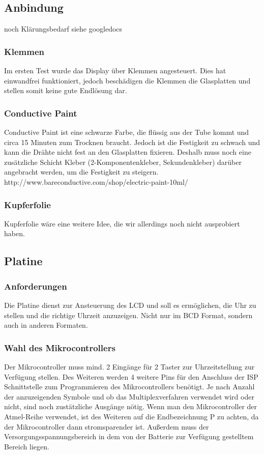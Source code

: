 \subsection{Anbindung}
noch Klärungsbedarf siehe googledocs

\subsubsection{Klemmen}
Im ersten Test wurde das Display über Klemmen angesteuert. Dies hat einwandfrei funktioniert, jedoch beschädigen die Klemmen die Glasplatten und stellen somit keine gute Endlösung dar.

\subsubsection{Conductive Paint}
Conductive Paint ist eine schwarze Farbe, die flüssig aus der Tube kommt und circa 15 Minuten zum Trocknen braucht. Jedoch ist die Festigkeit zu schwach und kann die Drähte nicht fest an den Glasplatten fixieren. Deshalb muss noch eine zusätzliche Schicht Kleber (2-Komponentenkleber, Sekundenkleber) darüber angebracht werden, um die Festigkeit zu steigern.
http://www.bareconductive.com/shop/electric-paint-10ml/

\subsubsection{Kupferfolie}
Kupferfolie wäre eine weitere Idee, die wir allerdings noch nicht ausprobiert haben.


\subsection{Platine}

\subsubsection{Anforderungen}
Die Platine dienst zur Ansteuerung des LCD und soll es ermöglichen, die Uhr zu stellen und die richtige Uhrzeit anzuzeigen. Nicht nur im BCD Format, sondern auch in anderen Formaten.

\subsubsection{Wahl des Mikrocontrollers}
Der Mikrocontroller muss mind. 2 Eingänge für 2 Taster zur Uhrzeitstellung zur Verfügung stellen. Des Weiteren werden 4 weitere Pins für den Anschluss der ISP Schnittstelle zum Programmieren des Mikrocontrollers benötigt. Je nach Anzahl der anzuzeigenden Symbole und ob das Multiplexverfahren verwendet wird oder nicht,  sind noch zustätzliche Ausgänge nötig. Wenn man den Mikrocontroller der Atmel-Reihe verwendet, ist des Weiteren auf die Endbezeichnung {\quote P} zu achten, da der Mikrocontroller dann stromsparender ist. Außerdem muss der Versorgungsspannungsbereich in dem von der Batterie zur Verfügung gestelltem Bereich liegen.

